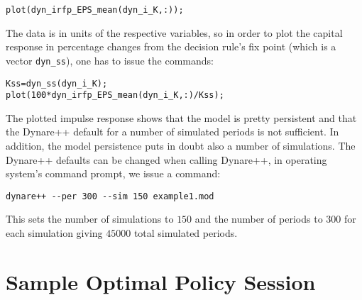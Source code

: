\documentclass[10pt]{article}
\begin{document}
{\small
\begin{verbatim}
plot(dyn_irfp_EPS_mean(dyn_i_K,:));
\end{verbatim}
}

The data is in units of the respective variables, so in order to plot
the capital response in percentage changes from the decision rule's
fix point (which is a vector {\tt dyn\_ss}), one has to issue the
commands:

{\small
\begin{verbatim}
Kss=dyn_ss(dyn_i_K);
plot(100*dyn_irfp_EPS_mean(dyn_i_K,:)/Kss);
\end{verbatim}
}

The plotted impulse response shows that the model is pretty persistent
and that the Dynare++ default for a number of simulated periods is not
sufficient. In addition, the model persistence puts in doubt also a
number of simulations. The Dynare++ defaults can be changed when
calling Dynare++, in operating system's command prompt, we issue a
command:

{\small
\begin{verbatim}
dynare++ --per 300 --sim 150 example1.mod
\end{verbatim}
}

\noindent This sets the number of simulations to $150$ and the number
of periods to $300$ for each simulation giving $45000$ total simulated
periods.

\section{Sample Optimal Policy Session}
\label{optim_tut}
\end{document}
